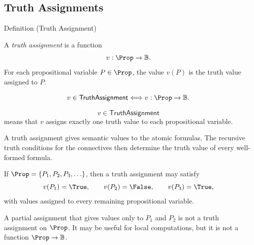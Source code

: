 \subsection*{Truth Assignments}
\label{subsec:truth-assignments-propositional-logic}

\begin{definitionbox}{Definition (Truth Assignment)}
\begin{definition}
\label{def:truth-assignment-propositional-logic}
A \emph{truth assignment} is a function
\[
v:\Prop\to\mathbb{B}.
\]
For each propositional variable \(P\in\Prop\), the value \(v(P)\) is the truth
value assigned to \(P\).
\end{definition}
\end{definitionbox}

\begin{remark*}
\[
v\in\mathsf{TruthAssignment}
\Longleftrightarrow
v:\Prop\to\mathbb{B}.
\]
\end{remark*}

\begin{remark*}
\[
v\in\mathsf{TruthAssignment}
\]
means that \(v\) assigns exactly one truth value to each propositional variable.
\end{remark*}

\begin{remark*}[Interpretation]
A truth assignment gives semantic values to the atomic formulas. The recursive
truth conditions for the connectives then determine the truth value of every
well-formed formula.
\end{remark*}

\begin{remark*}[Examples]
If \(\Prop=\{P_1,P_2,P_3,\ldots\}\), then a truth assignment may satisfy
\[
v(P_1)=\True,\qquad v(P_2)=\False,\qquad v(P_3)=\True,
\]
with values assigned to every remaining propositional variable.
\end{remark*}

\begin{remark*}
A partial assignment that gives values only to \(P_1\) and \(P_2\) is not a truth
assignment on \(\Prop\). It may be useful for local computations, but it is not a
function \(\Prop\to\mathbb{B}\).
\end{remark*}


